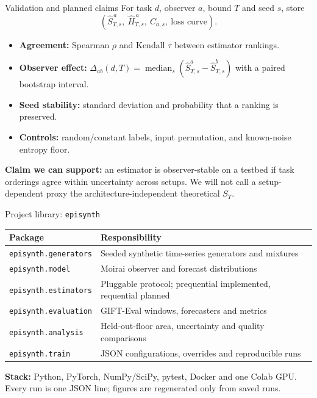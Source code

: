 \documentclass[aspectratio=43]{beamer}
\begin{document}
\begin{frame}{Validation and planned claims}
For task $d$, observer $a$, bound $T$ and seed $s$, store
\[
 (\widehat S^{\,a}_{T,s},\ \widehat H^{\,a}_{T,s},\ C_{a,s},\ \text{loss curve}).
\]
\begin{itemize}
\item \textbf{Agreement:} Spearman $\rho$ and Kendall $\tau$ between estimator rankings.
\item \textbf{Observer effect:} $\Delta_{ab}(d,T)=\operatorname{median}_s
      (\widehat S^a_{T,s}-\widehat S^b_{T,s})$ with a paired bootstrap interval.
\item \textbf{Seed stability:} standard deviation and probability that a ranking is preserved.
\item \textbf{Controls:} random/constant labels, input permutation, and known-noise entropy floor.
\end{itemize}

\medskip
\textbf{Claim we can support:} an estimator is observer-stable on a testbed if task orderings agree
within uncertainty across setups. We will not call a setup-dependent proxy the architecture-independent
theoretical $S_T$.
\end{frame}

\begin{frame}{Project library: \texttt{episynth}}
\begin{center}
\small
\begin{tabular}{@{}>{\raggedright\arraybackslash}p{.30\linewidth}>{\raggedright\arraybackslash}p{.63\linewidth}@{}}
\toprule
Package & Responsibility \\
\midrule
\texttt{episynth.generators} & Seeded synthetic time-series generators and mixtures \\
\texttt{episynth.model} & Moirai observer and forecast distributions \\
\texttt{episynth.estimators} & Pluggable protocol; prequential implemented, requential planned \\
\texttt{episynth.evaluation} & GIFT-Eval windows, forecasters and metrics \\
\texttt{episynth.analysis} & Held-out-floor area, uncertainty and quality comparisons \\
\texttt{episynth.train} & JSON configurations, overrides and reproducible runs \\
\bottomrule
\end{tabular}
\end{center}

\medskip
\textbf{Stack:} Python, PyTorch, NumPy/SciPy, pytest, Docker and one Colab GPU.
Every run is one JSON line; figures are regenerated only from saved runs.
\end{frame}
\end{document}
